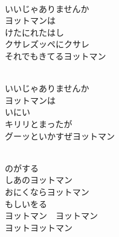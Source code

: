 \documentclass[10pt,b5j]{tarticle} %
\begin{document}
\begin{enumerate}
\begin{minipage}[c]{\blocksize}
        \vspace{\linespace}
        \item~\\
        いいじゃありませんか\\
        ヨットマンは\\
        けたにれたはし\\
        クサレズッペにクサレ\\
        それでもきてるヨットマン
        
        \vspace{\linespace}
        \item~\\
        いいじゃありませんか\\
        ヨットマンは\\
        いにい\\
        キリリとまったが\\
        グーッといかすぜヨットマン
        
        \vspace{\linespace}
        \item~\\
        のがする\\
        しあのヨットマン\\
        おにくならヨットマン\\
        もしいをる\\
        ヨットマン　ヨットマン\\
        ヨットヨットマン
    
    \end{minipage}
\end{enumerate} %
\end{document}
